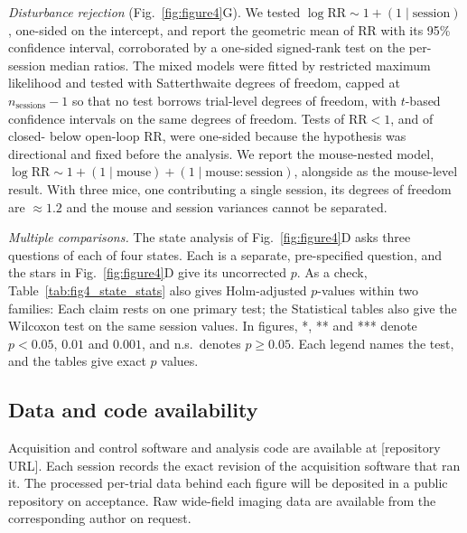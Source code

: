 \emph{Disturbance rejection} (Fig.~\ref{fig:figure4}G).
We tested $\log \mathrm{RR} \sim 1 + (1 \mid \mathrm{session})$, one-sided on the intercept, and report the geometric mean of $\mathrm{RR}$ with its 95\% confidence interval, corroborated by a one-sided signed-rank test on the per-session median ratios.
The mixed models were fitted by restricted maximum likelihood and tested with Satterthwaite degrees of freedom, capped at $n_{\mathrm{sessions}} - 1$ so that no test borrows trial-level degrees of freedom, with $t$-based confidence intervals on the same degrees of freedom.
Tests of $\mathrm{RR} < 1$, and of closed- below open-loop $\mathrm{RR}$, were one-sided because the hypothesis was directional and fixed before the analysis.
We report the mouse-nested model, $\log \mathrm{RR} \sim 1 + (1 \mid \mathrm{mouse}) + (1 \mid \mathrm{mouse}\!:\!\mathrm{session})$, alongside as the mouse-level result.
With three mice, one contributing a single session, its degrees of freedom are ${\approx}1.2$ and the mouse and session variances cannot be separated.

\emph{Multiple comparisons.} The state analysis of Fig.~\ref{fig:figure4}D asks three questions of each of four states.
Each is a separate, pre-specified question, and the stars in Fig.~\ref{fig:figure4}D give its uncorrected $p$.
As a check, Table~\ref{tab:fig4_state_stats} also gives Holm-adjusted $p$-values within two families: 
Each claim rests on one primary test; the Statistical tables also give the Wilcoxon test on the same session values.
In figures, *, ** and *** denote $p < 0.05$, $0.01$ and $0.001$, and n.s.\ denotes $p \ge 0.05$.
Each legend names the test, and the tables give exact $p$ values.

\subsection*{Data and code availability}

Acquisition and control software and analysis code are available at [repository URL].
Each session records the exact revision of the acquisition software that ran it.
The processed per-trial data behind each figure will be deposited in a public repository on acceptance.
Raw wide-field imaging data are available from the corresponding author on request.
